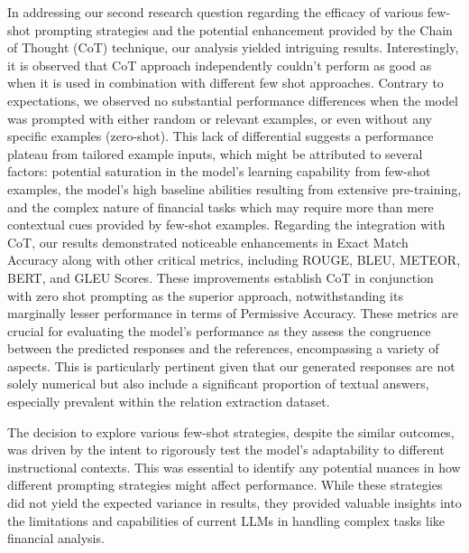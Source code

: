 \documentclass[logo,msc]{infthesis}           %
\begin{document}
In addressing our second research question regarding the efficacy of various few-shot prompting strategies and the potential enhancement provided by the Chain of Thought (CoT) technique, our analysis yielded intriguing results. Interestingly, it is observed that CoT approach independently couldn't perform as good as when it is used in combination with different few shot approaches. Contrary to expectations, we observed no substantial performance differences when the model was prompted with either random or relevant examples, or even without any specific examples (zero-shot). This lack of differential suggests a performance plateau from tailored example inputs, which might be attributed to several factors: potential saturation in the model's learning capability from few-shot examples, the model's high baseline abilities resulting from extensive pre-training, and the complex nature of financial tasks which may require more than mere contextual cues provided by few-shot examples. Regarding the integration with CoT, our results demonstrated noticeable enhancements in Exact Match Accuracy along with other critical metrics, including ROUGE, BLEU, METEOR, BERT, and GLEU Scores. These improvements establish CoT in conjunction with zero shot prompting as the superior approach, notwithstanding its marginally lesser performance in terms of Permissive Accuracy. These metrics are crucial for evaluating the model's performance as they assess the congruence between the predicted responses and the references, encompassing a variety of aspects. This is particularly pertinent given that our generated responses are not solely numerical but also include a significant proportion of textual answers, especially prevalent within the relation extraction dataset.

The decision to explore various few-shot strategies, despite the similar outcomes, was driven by the intent to rigorously test the model’s adaptability to different instructional contexts. This was essential to identify any potential nuances in how different prompting strategies might affect performance. While these strategies did not yield the expected variance in results, they provided valuable insights into the limitations and capabilities of current LLMs in handling complex tasks like financial analysis. 
\end{document}
